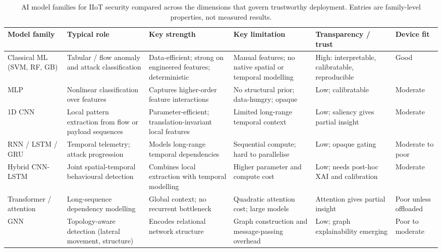 \begin{table}[!htbp]
  \centering
  \footnotesize
  \setlength{\tabcolsep}{4pt}
  \renewcommand{\arraystretch}{1.25}
  \caption{AI model families for IIoT security compared across the dimensions that govern trustworthy deployment. Entries are family-level properties, not measured results.}
  \label{tab:ai-family-comparison}
  \begin{tabularx}{\textwidth}{@{}
      >{\raggedright\arraybackslash}p{2.4cm}
      >{\raggedright\arraybackslash}X
      >{\raggedright\arraybackslash}X
      >{\raggedright\arraybackslash}X
      >{\raggedright\arraybackslash}X
      >{\raggedright\arraybackslash}p{1.6cm}@{}}
    \toprule
    \textbf{Model family} & \textbf{Typical role} & \textbf{Key strength} & \textbf{Key limitation} & \textbf{Transparency / trust} & \textbf{Device fit} \\
    \midrule
    Classical ML (SVM, RF, GB) & Tabular / flow anomaly and attack classification & Data-efficient; strong on engineered features; deterministic & Manual features; no native spatial or temporal modelling & High: interpretable, calibratable, reproducible & Good \\
    \addlinespace
    MLP & Nonlinear classification over features & Captures higher-order feature interactions & No structural prior; data-hungry; opaque & Low; calibratable & Moderate \\
    \addlinespace
    1D CNN & Local pattern extraction from flow or payload sequences & Parameter-efficient; translation-invariant local features & Limited long-range temporal context & Low; saliency gives partial insight & Moderate \\
    \addlinespace
    RNN / LSTM / GRU & Temporal telemetry; attack progression & Models long-range temporal dependencies & Sequential compute; hard to parallelise & Low; opaque gating & Moderate to poor \\
    \addlinespace
    Hybrid CNN-LSTM & Joint spatial-temporal behavioural detection & Combines local extraction with temporal modelling & Higher parameter and compute cost & Low; needs post-hoc XAI and calibration & Moderate \\
    \addlinespace
    Transformer / attention & Long-sequence dependency modelling & Global context; no recurrent bottleneck & Quadratic attention cost; large models & Attention gives partial insight & Poor unless offloaded \\
    \addlinespace
    GNN & Topology-aware detection (lateral movement, structure) & Encodes relational network structure & Graph construction and message-passing overhead & Low; graph explainability emerging & Poor to moderate \\
    \bottomrule
  \end{tabularx}
\end{table}

